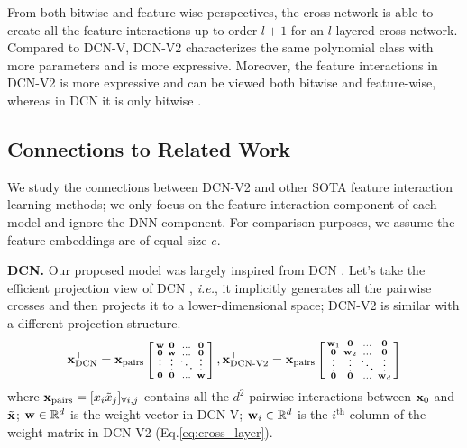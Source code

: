 \documentclass[sigconf]{acmart}
\newcommand{\vecx}{{\bf x}}
\newcommand{\vecw}{{\bf w}}
\newcommand{\veczero}{{\bf 0}}
\begin{document}
From both bitwise and feature-wise perspectives, the cross network is able to create all the feature interactions up to order $l+1$ for an $l$-layered cross network. Compared to DCN-V, {DCN-V2} characterizes the same polynomial class with more parameters and is more expressive. Moreover, the feature interactions in {DCN-V2} is more expressive and can be viewed both bitwise and feature-wise, whereas in DCN it is only bitwise \cite{wang2017deep, lian2018xdeepfm, song2019autoint}.

\subsection{Connections to Related Work}
We study the connections between {DCN-V2} and other SOTA feature interaction learning methods; we only focus on the feature interaction component of each model and ignore the DNN component. For comparison purposes, we assume the feature embeddings are of equal size $e$.

{\bf DCN.} Our proposed model was largely inspired from DCN \cite{wang2017deep}. Let's take the efficient projection view of DCN \cite{wang2017deep}, \emph{i.e.}, it implicitly generates all the pairwise crosses and then projects it to a lower-dimensional space; {DCN-V2} is similar with a different projection structure.
    \begin{equation*}
    	\begin{split}
    	\vecx_{\text{DCN}}^\top = 
        \vecx_{\text{pairs}}
        \left[\begin{smallmatrix}
        	\vecw & \veczero & \ldots & \veczero \\
            \veczero & \vecw & \ldots & \veczero \vspace{-1ex}\\
            \vdots   & \vdots& \ddots & \vdots \\
            \veczero & \veczero & \ldots & \vecw
        \end{smallmatrix}\right], 
        \vecx_{\text{{DCN-V2}}}^\top = 
        \vecx_{\text{pairs}}
         \left[\begin{smallmatrix}
        	\vecw_1 & \veczero & \ldots & \veczero \\
            \veczero & \vecw_2 & \ldots & \veczero \vspace{-1ex}\\
            \vdots   & \vdots& \ddots & \vdots \\
            \veczero & \veczero & \ldots & \vecw_d
        \end{smallmatrix}\right]
        \end{split}
    \end{equation*}
where
$\vecx_{\text{pairs}} = [x_i \tilde x_j]_{\forall i, j}$
contains all the $d^2$ pairwise interactions between $\vecx_0$ and $\tilde \vecx$; $\vecw \in \mathbb{R}^d$ is the weight vector in DCN-V; $\vecw_i \in \mathbb{R}^d$ is the $i^\text{th}$ column of the weight matrix in {DCN-V2} (Eq.\eqref{eq:cross_layer}).
\end{document}
